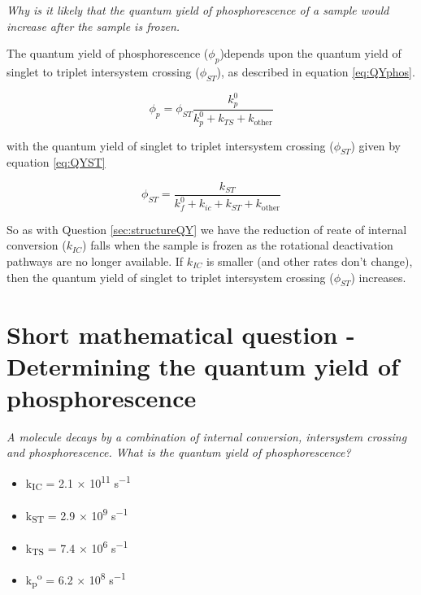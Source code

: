 \documentclass[
]{book}
\providecommand{\tightlist}{%
  \setlength{\itemsep}{0pt}\setlength{\parskip}{0pt}}
\begin{document}
\emph{Why is it likely that the quantum yield of phosphorescence of a sample would increase after the sample is frozen.}

The quantum yield of phosphorescence (\(\phi_p\))depends upon the quantum yield of singlet to triplet intersystem crossing (\(\phi_{ST}\)), as described in equation \eqref{eq:QYphos}.

\begin{equation}
\phi_p = \phi_{ST}\frac{k_p^0}{k_p^0+ k_{TS}+k_{\textrm{other}}}
\label{eq:QYphos}
\end{equation}

with the quantum yield of singlet to triplet intersystem crossing (\(\phi_{ST}\)) given by equation \eqref{eq:QYST}

\begin{equation}
\phi_{ST} = \frac{k_{ST}}{k_f^0+k_{ic}+ k_{ST}+k_{\textrm{other}}}
\label{eq:QYST}
\end{equation}

So as with Question \ref{sec:structureQY} we have the reduction of reate of internal conversion (\(k_{IC}\)) falls when the sample is frozen as the rotational deactivation pathways are no longer available. If \(k_{IC}\) is smaller (and other rates don't change), then the quantum yield of singlet to triplet intersystem crossing (\(\phi_{ST}\)) increases.

\hypertarget{sec:calcphos}{%
\section{Short mathematical question - Determining the quantum yield of phosphorescence}\label{sec:calcphos}}

\emph{A molecule decays by a combination of internal conversion, intersystem crossing and phosphorescence. What is the quantum yield of phosphorescence?}

\begin{itemize}
\tightlist
\item
  k\textsubscript{IC} = 2.1 × 10\textsuperscript{11} s\textsuperscript{−1}
\item
  k\textsubscript{ST} = 2.9 × 10\textsuperscript{9} s\textsuperscript{−1}
\item
  k\textsubscript{TS} = 7.4 × 10\textsuperscript{6} s\textsuperscript{−1}
\item
  k\textsubscript{p}\textsuperscript{o} = 6.2 × 10\textsuperscript{8} s\textsuperscript{−1}
\end{itemize}
\end{document}
